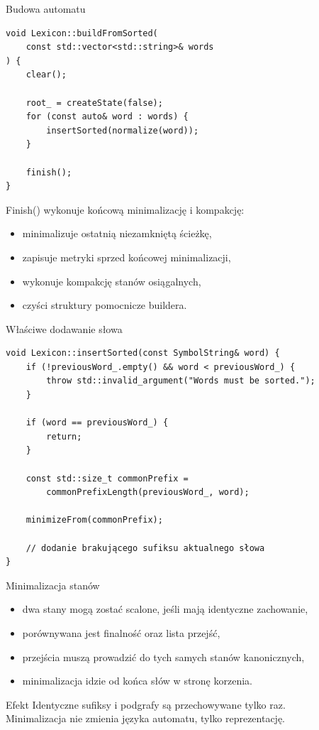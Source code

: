 \documentclass{beamer}
\begin{document}
\begin{frame}[fragile]{Budowa automatu}
    \begin{verbatim}
void Lexicon::buildFromSorted(
    const std::vector<std::string>& words
) {
    clear();

    root_ = createState(false);
    for (const auto& word : words) {
        insertSorted(normalize(word));
    }

    finish();
}
\end{verbatim}

    Finish() wykonuje końcową minimalizację i kompakcję:
    \begin{itemize}
        \item minimalizuje ostatnią niezamkniętą ścieżkę,
        \item zapisuje metryki sprzed końcowej minimalizacji,
        \item wykonuje kompakcję stanów osiągalnych,
        \item czyści struktury pomocnicze buildera.
    \end{itemize}

\end{frame}

\begin{frame}[fragile]{Właściwe dodawanie słowa}
    \begin{verbatim}
void Lexicon::insertSorted(const SymbolString& word) {
    if (!previousWord_.empty() && word < previousWord_) {
        throw std::invalid_argument("Words must be sorted.");
    }

    if (word == previousWord_) {
        return;
    }

    const std::size_t commonPrefix =
        commonPrefixLength(previousWord_, word);

    minimizeFrom(commonPrefix);

    // dodanie brakującego sufiksu aktualnego słowa
}
\end{verbatim}
\end{frame}

\begin{frame}{Minimalizacja stanów}
    \begin{itemize}
        \item dwa stany mogą zostać scalone, jeśli mają identyczne zachowanie,
        \item porównywana jest finalność oraz lista przejść,
        \item przejścia muszą prowadzić do tych samych stanów kanonicznych,
        \item minimalizacja idzie od końca słów w stronę korzenia.
    \end{itemize}

    \begin{block}{Efekt}
        Identyczne sufiksy i podgrafy są przechowywane tylko raz. \\Minimalizacja nie zmienia języka automatu, tylko reprezentację.
    \end{block}
\end{frame}
\end{document}

